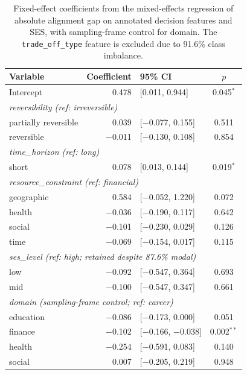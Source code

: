 \begin{table}[h]
  \centering
  \caption{Fixed-effect coefficients from the mixed-effects regression
    of absolute alignment gap on annotated decision features and SES,
    with sampling-frame control for domain. The
    \texttt{trade\_off\_type} feature is excluded due to 91.6\%
    class imbalance.}
  \label{tab:m_mixedlm_coefs}
  \begin{tabular}{lrlc}
    \toprule
    Variable & Coefficient & 95\% CI & $p$ \\
    \midrule
    Intercept                  &  0.478 & [0.011, 0.944]    & 0.045$^{*}$ \\
    \midrule
    \multicolumn{4}{l}{\textit{reversibility (ref: irreversible)}} \\
    \quad partially reversible &  0.039 & [$-$0.077, 0.155] & 0.511   \\
    \quad reversible           & $-$0.011 & [$-$0.130, 0.108] & 0.854 \\
    \midrule
    \multicolumn{4}{l}{\textit{time\_horizon (ref: long)}} \\
    \quad short                &  0.078 & [0.013, 0.144]    & 0.019$^{*}$ \\
    \midrule
    \multicolumn{4}{l}{\textit{resource\_constraint (ref: financial)}} \\
    \quad geographic           &  0.584 & [$-$0.052, 1.220] & 0.072  \\
    \quad health               & $-$0.036 & [$-$0.190, 0.117] & 0.642 \\
    \quad social               & $-$0.101 & [$-$0.230, 0.029] & 0.126 \\
    \quad time                 & $-$0.069 & [$-$0.154, 0.017] & 0.115 \\
    \midrule
    \multicolumn{4}{l}{\textit{ses\_level (ref: high; retained despite 87.6\% modal)}} \\
    \quad low                  & $-$0.092 & [$-$0.547, 0.364] & 0.693 \\
    \quad mid                  & $-$0.100 & [$-$0.547, 0.347] & 0.661 \\
    \midrule
    \multicolumn{4}{l}{\textit{domain (sampling-frame control; ref: career)}} \\
    \quad education            & $-$0.086 & [$-$0.173, 0.000]   & 0.051 \\
    \quad finance              & $-$0.102 & [$-$0.166, $-$0.038] & 0.002$^{**}$ \\
    \quad health               & $-$0.254 & [$-$0.591, 0.083]   & 0.140 \\
    \quad social               &  0.007 & [$-$0.205, 0.219]   & 0.948 \\
    \bottomrule
  \end{tabular}
\end{table}

